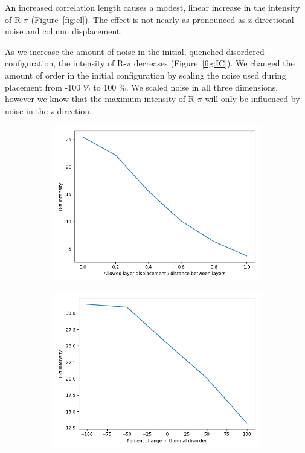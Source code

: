 \documentclass{article}
\begin{document}
  An increased correlation length causes a modest, linear increase in the
  intensity of R-$\pi$ (Figure~\ref{fig:cl}). The effect is not nearly as
  pronounced as z-directional noise and column displacement.

  As we increase the amount of noise in the initial, quenched disordered
  configuration, the intensity of R-$\pi$ decreases (Figure~\ref{fig:IC}).  We
  changed the amount of order in the initial configuration by scaling the noise
  used during placement from -100 \% to 100 \%. We scaled noise in all three
  dimensions, however we know that the maximum intensity of R-$\pi$ will only be
  influenced by noise in the z direction.

  \begin{figure}
  \centering
  \begin{subfigure}{0.45\textwidth} 
  \includegraphics[width=\textwidth]{ld.png}
  \caption{}\label{fig:ld}
  \end{subfigure}
  \begin{subfigure}{0.45\textwidth} 
  \includegraphics[width=\textwidth]{td.png}

\end{subfigure}
\end{figure}
\end{document}
